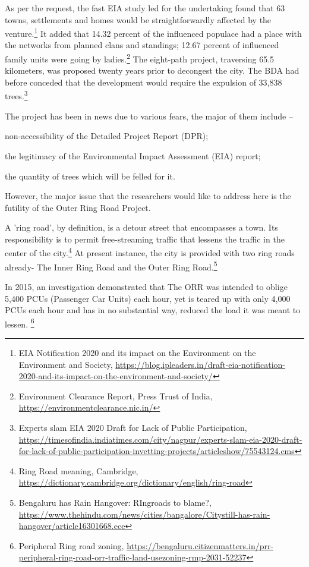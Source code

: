 \begin{multicols}{2}
\vspace{-.2cm}

\noi
As per the request, the fast EIA study led for the undertaking found that 63 towns, settlements
and homes would be straightforwardly affected by the venture.\footnote{EIA Notification 2020 and its impact on the Environment on the Environment and Society,
\url{https://blog.ipleaders.in/draft-eia-notification-2020-and-its-impact-on-the-environment-and-society/}} It added that 14.32 percent
of the influenced populace had a place with the networks from planned clans and standings;
12.67 percent of influenced family units were going by ladies.\footnote{Environment Clearance Report, Press Trust of India, \url{https://environmentclearance.nic.in/}} The eight-path project,
traversing 65.5 kilometers, was proposed twenty years prior to decongest the city. The BDA
had before conceded that the development would require the expulsion of 33,838 trees.\footnote{Experts slam EIA 2020 Draft for Lack of Public Participation,
\url{https://timesofindia.indiatimes.com/city/nagpur/experts-slam-eia-2020-draft-for-lack-of-public-participation-invetting-projects/articleshow/75543124.cms}}



\noi
The project has been in news due to various fears, the major of them include –

\noi
non-accessibility of the Detailed Project Report (DPR);

\noi
the legitimacy of the Environmental Impact Assessment (EIA) report;

\noi
the quantity of trees which will be felled for it. 

\noi
However, the major issue that the researchers would like to address here is the futility of the Outer Ring Road Project.

\noi
A 'ring road', by definition, is a detour street that encompasses a town. Its responsibility is to
permit free-streaming traffic that lessens the traffic in the center of the city.\footnote{Ring Road meaning, Cambridge, \url{https://dictionary.cambridge.org/dictionary/english/ring-road}} At present
instance, the city is provided with two ring roads already- The Inner Ring Road and the Outer
Ring Road.\footnote{Bengaluru has Rain Hangover: RIngroads to blame?, \url{https://www.thehindu.com/news/cities/bangalore/Citystill-has-rain-hangover/article16301668.ece}}

\vspace{.2cm}
\noi
In 2015, an investigation demonstrated that The ORR was intended to oblige 5,400 PCUs
(Passenger Car Units) each hour, yet is teared up with only 4,000 PCUs each hour and has in
no substantial way, reduced the load it was meant to lessen. \footnote{Peripheral Ring road zoning, \url{https://bengaluru.citizenmatters.in/prr-peripheral-ring-road-orr-traffic-land-usezoning-rmp-2031-52237}}


\end{multicols}
